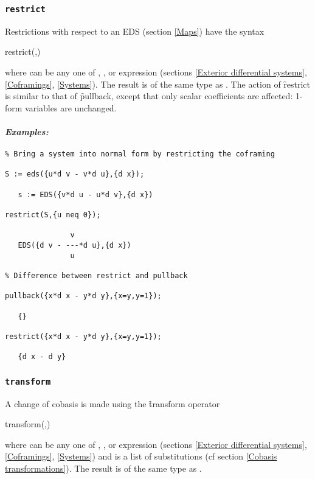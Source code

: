 \subsubsection{\tt restrict}
\label{restrict}

Restrictions with respect to an EDS  (section \ref{Maps}) have the
syntax
\begin{edssyntax}
	restrict(,)
\end{edssyntax}
where  can be any one of , ,
 or  expression (sections \ref{Exterior
differential systems}, \ref{Coframings}, \ref{Systems}). The result is of
the same type as . The action of \f{restrict} is similar to that
of \f{pullback}, except that only scalar coefficients are affected: 1-form
variables are unchanged.

\paragraph{\it Examples:}
\begin{verbatim}
% Bring a system into normal form by restricting the coframing

S := eds({u*d v - v*d u},{d x});

   s := EDS({v*d u - u*d v},{d x}) 

restrict(S,{u neq 0});

               v
   EDS({d v - ---*d u},{d x})
               u 

% Difference between restrict and pullback

pullback({x*d x - y*d y},{x=y,y=1});

   {}

restrict({x*d x - y*d y},{x=y,y=1});

   {d x - d y}
\end{verbatim}

\subsubsection{\tt transform}
\label{transform}

A change of cobasis is made using the \f{transform} operator
\begin{edssyntax}
	transform(,)
\end{edssyntax}
where  can be any one of , ,
 or  expression (sections \ref{Exterior
differential systems}, \ref{Coframings}, \ref{Systems}) and 
is a list of substitutions (cf section \ref{Cobasis transformations}). The
result is of the same type as .

